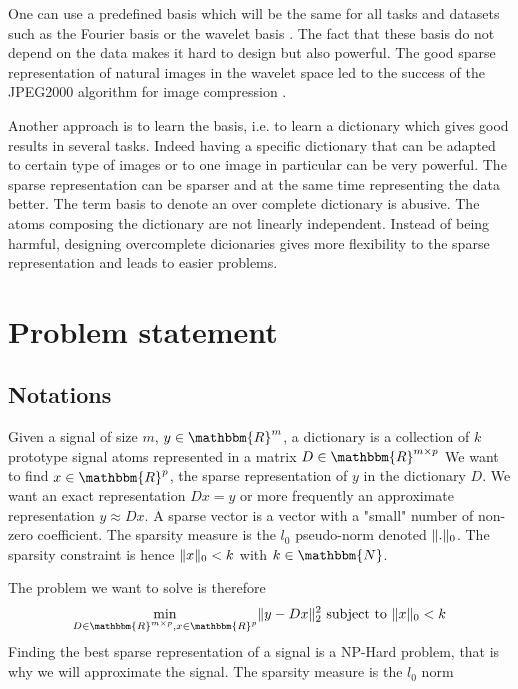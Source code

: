 \documentclass[a4paper,11pt]{article}
\newcommand{\RR}{\mathbbm{R}} %
\DeclarePairedDelimiter\norm{\lVert}{\rVert} %
\begin{document}
One can use a predefined basis which will be the same for all tasks and datasets such as the Fourier basis or the wavelet basis \cite{mallat1999}.
The fact that these basis do not depend on the data makes it hard to design but also powerful.
The good sparse representation of natural images in the wavelet space led to the success of the JPEG2000 algorithm for image compression \cite{marcellin00}.

Another approach is to learn the basis, i.e. to learn a dictionary which gives good results in several tasks. Indeed having a specific dictionary that can be adapted to certain type of images or to one image in particular can be very powerful.
The sparse representation can be sparser and at the same time representing the data better.
The term basis to denote an over complete dictionary is abusive. The atoms composing the dictionary are not linearly independent.
Instead of being harmful, designing overcomplete dicionaries gives more flexibility to the sparse representation and leads to easier problems.

\section{Problem statement}
\subsection{Notations}
Given a signal of size $m$, $y \in \RR^m$, a dictionary is a collection of $k$ prototype signal atoms represented in a matrix $D \in \RR^{m \times p}$
We want to find $x \in \RR^p$, the sparse representation of $y$ in the dictionary $D$.
We want an exact representation $D x = y$ or more frequently an approximate representation $y \approx D x$.
A sparse vector is a vector with a "small" number of non-zero coefficient.
The sparsity measure is the $l_0$ pseudo-norm denoted $\norm{.}_0$.
The sparsity constraint is hence $\norm{x}_0<k$ with $k \in \mathbbm{N}$.

The problem we want to solve is therefore
\begin{equation*}
\min\limits_{D \in \RR^{m \times p}, x \in \RR^p} \norm{y - Dx}_2^2  \text{ subject to } \norm{x}_0<k
\end{equation*}
Finding the best sparse representation of a signal is a NP-Hard problem, that is why we will approximate the signal.
The sparsity measure is the $l_0$ norm
\end{document}

